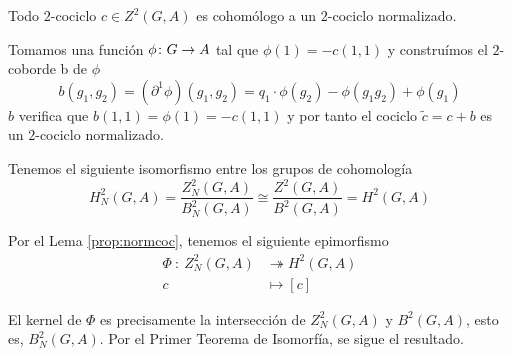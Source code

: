 \begin{lema}\label{prop:normcoc}
	Todo $2$-cociclo $c\in Z^2(G,A)$ es cohomólogo a un $2$-cociclo normalizado. %
	\begin{demostracion}
		Tomamos una función $\phi\colon G\to A$ tal que $\phi(1) = -c(1,1)$ y construímos el $2$-coborde b de $\phi$
		\begin{equation*}
			b(g_1,g_2) = (\partial^1 \phi)(g_1,g_2) =  q_1\cdot \phi(g_2) - \phi(g_1g_2) + \phi(g_1)
		\end{equation*}
		$b$ verifica que $b(1,1) = \phi(1) = -c(1,1)$ y por tanto el cociclo $\tilde c = c+b$ es un $2$-cociclo normalizado.
	\end{demostracion}
\end{lema}

\begin{teorema}\label{thm:h2hn2}
	Tenemos el siguiente isomorfismo entre los grupos de cohomología
	\begin{equation}
		H^2_N(G,A) = \frac{Z^2_N(G,A)}{B^2_N(G,A)} \cong \frac{Z^2(G,A)}{B^2(G,A)} = H^2(G,A)
	\end{equation}
	\begin{demostracion}
		Por el Lema \ref{prop:normcoc}, tenemos el siguiente epimorfismo
		\begin{align*}
			\Phi \ \colon \ Z^2_N(G,A) &\twoheadrightarrow H^2(G,A) \\
			c \ &\mapsto [c]
		\end{align*}
		
		El kernel de $\Phi$ es precisamente la intersección de $Z^2_N(G,A)$ y $B^2(G,A)$, esto es, $B^2_N(G,A)$. Por el Primer Teorema de Isomorfía, se sigue el resultado.
	\end{demostracion}
\end{teorema}

